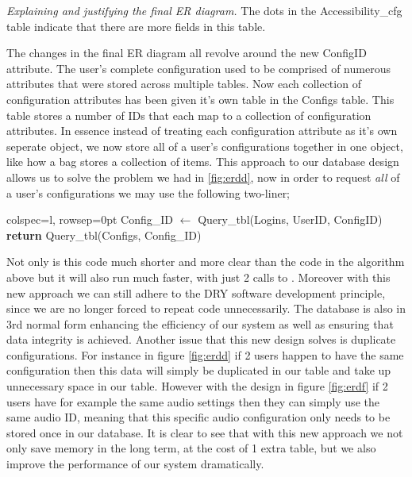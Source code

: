 \textit{Explaining and justifying the final ER diagram.}
The dots in the {\sffamily Accessibility\_cfg} table indicate
that there are more fields in this table. \\ \vspace{0.2cm}

The changes in the final ER diagram all revolve around the new
ConfigID attribute. The user's complete configuration used to 
be comprised of numerous attributes that were stored across
multiple tables. Now each collection of configuration
attributes has been given it's own table in the
{\sffamily Configs} table. This table stores a number of IDs
that each map to a collection of configuration attributes.
In essence instead of treating each configuration attribute as
it's own seperate object, we now store all of a user's 
configurations together in one object, like how a bag stores
a collection of items. This approach to our database design
allows us to solve the problem we had in \ref{fig:erdd}, now
in order to request \textit{all} of a user's configurations
we may use the following two-liner;\\

\begin{center}
\begin{tblr}{colspec={l}, rowsep=0pt}
  {\sffamily Config\_ID} $\gets$ {\sffamily Query\_tbl(Logins, UserID, ConfigID)}\\
  {\sffamily \textbf{return} Query\_tbl(Configs, Config\_ID)}\\
\end{tblr}
\end{center}

Not only is this code much shorter and more clear than the 
code in the algorithm above but it will also run much
faster, with just 2 calls to . Moreover
with this new approach we can still adhere to the DRY software
development principle, since we are no longer forced to repeat
code unnecessarily. The database is also in 3rd normal form
enhancing the efficiency of our system as 
well as ensuring that data integrity is achieved.
Another issue that this new design solves
is duplicate configurations. For instance in figure 
\ref{fig:erdd} if 2 users happen to have the same
configuration then this data will simply be duplicated in our 
table and take up unnecessary space in our table. However 
with the design in figure \ref{fig:erdf} if 2 users have for
example the same audio settings then they can simply use the
same audio ID, meaning that this specific audio configuration 
only needs to be stored once in our database. It is clear to 
see that with this new approach we not only save memory in 
the long term, at the cost of 1 extra table, but we also 
improve the performance of our system dramatically. \\
\vspace{0.2cm}

